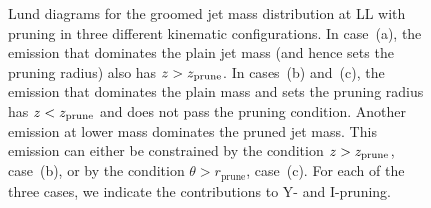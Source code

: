 \begin{figure}[t!]
    \centering
  \hfill%
  \hfill%
  \caption{Lund diagrams for the groomed jet mass distribution at LL
    with pruning in three different kinematic configurations. In
    case~(a), the emission that dominates the plain jet mass (and
    hence sets the pruning radius) also has $z>z_{\text{prune}}$.
    In cases~(b) and~(c), the emission that dominates the plain mass
    and sets the pruning radius has $z<z_{\text{prune}}$ and does not pass the
    pruning condition.
    Another emission at lower mass dominates the pruned jet mass. This
    emission can either be constrained by the condition $z>z_{\text{prune}}$,
    case~(b), or by the condition $\theta>r_\text{prune}$, case~(c).
    For each of the three cases, we indicate the contributions to Y-
    and I-pruning.}\label{fig:lund-pruning}
\end{figure}

